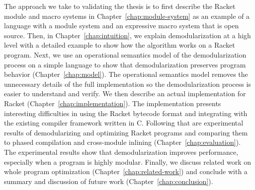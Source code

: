 The approach we take to validating the thesis is to first describe the Racket module and macro systems in Chapter~\ref{chap:module-system} as an example of a language with a module system and an expressive macro system that is open source.
Then, in Chapter~\ref{chap:intuition}, we explain demodularization at a high level with a detailed example to show how the algorithm works on a Racket program.
Next, we use an operational semantics model of the demodularization process on a simple language to show that demodularization preserves program behavior (Chapter~\ref{chap:model}).
The operational semantics model removes the unnecessary details of the full implementation so the demodularization process is easier to understand and verify. 
We then describe an actual implementation for Racket (Chapter~\ref{chap:implementation}).
The implementation presents interesting difficulties in using the Racket bytecode format and integrating with the existing compiler framework written in C.  
Following that are experimental results of demodularizing and optimizing Racket programs and comparing them to phased compilation and cross-module inlining (Chapter~\ref{chap:evaluation}). 
The experimental results show that demodularization improves performance, especially when a program is highly modular.
Finally, we discuss related work on whole program optimization (Chapter~\ref{chap:related-work}) and conclude with a summary and discussion of future work (Chapter~\ref{chap:conclusion}). 
